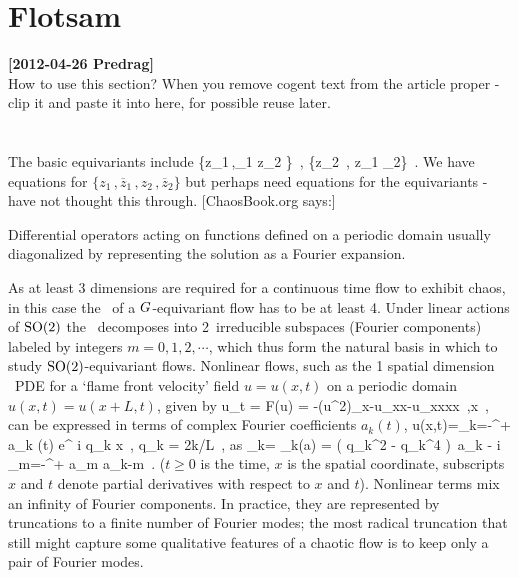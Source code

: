 
\section{Flotsam}
\label{s:flotsam}

\noindent
{\bf [2012-04-26 Predrag]}
\\
How to use this section? When you remove cogent text from the article
proper - clip  it and paste it into here, for possible reuse later.
\\\\\\

The basic equivariants include
\beq
  \{{z}_1\,,_1 {z}_2 \}
            \,,\qquad
  \{{z}_2 \,, z_1 _2\}
\,.
\eeq
We have equations  for $\{{z}_1\,,\overline{z}_1\,,
{z}_2\,,\overline{z}_2 \}$ but perhaps need equations for the
equivariants  - have not thought this through.
[ChaosBook.org says:]

Differential operators acting on functions defined on a periodic domain
usually diagonalized by representing the solution as a Fourier expansion.

As at least 3 dimensions are required for a continuous time flow to
exhibit chaos, in this case the \statesp\ of a $G$-equivariant flow
has to be at least 4\dmn. Under linear actions of $\textrm{SO}(2)$ the \statesp\
decomposes into 2\dmn\ irreducible subspaces (Fourier components) labeled
by integers $m = 0,1,2,\cdots$, which thus form the natural basis in which
to study $\textrm{SO}(2)$-equivariant flows. Nonlinear flows, such as the
1 spatial dimension \KS\ PDE for a `flame front velocity' field
$u=u(x,t)$ on a periodic domain $u(x,t) = u(x+L,t)$, given by
\beq
  u_t = F(u) = -{\textstyle{}}(u^2)_x-u_{xx}-u_{xxxx}
    \,,\qquad   x \in [-L/2,L/2]
    \,,
can be
expressed in terms of complex Fourier coefficients $a_k(t)$,
\beq
  u(x,t)=\sum_{k=-\infty}^{+\infty} a_k (t) e^{ i q_k x}
\,,\qquad
  q_k = 2\pi k/L
\,,
as
\beq
{}_k= \pVeloc_k(a)
     = ( q_k^2 - q_k^4 )\, a_k
    - i  \sum_{m=-\infty}^{+\infty} a_m a_{k-m}
\,.
($t \geq 0$ is the time, $x$ is the spatial coordinate, subscripts $x$
and $t$ denote partial derivatives with respect to $x$ and $t$).
Nonlinear terms mix an infinity of
Fourier components. In practice, they are represented by truncations to
a finite number of Fourier modes; the most radical truncation that
still might capture some qualitative features of a chaotic flow is to keep
only a pair of Fourier modes.


